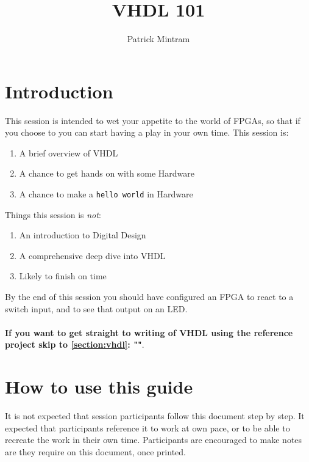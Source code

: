 \documentclass[11pt,a4paper]{article}
\title{VHDL 101}
\author{Patrick Mintram}
\begin{document}
\clearpage\maketitle
\thispagestyle{empty} %
\pagebreak

\section{Introduction}
This session is intended to wet your appetite to the world of FPGAs, so that if you choose to you can start having a play in your own time. This session is:
\begin{enumerate}
    \item A brief overview of VHDL
    \item A chance to get hands on with some Hardware
    \item A chance to make a \texttt{hello world} in Hardware
\end{enumerate}

Things this session is \emph{not}:
\begin{enumerate}
    \item An introduction to Digital Design
    \item A comprehensive deep dive into VHDL
    \item Likely to finish on time
\end{enumerate}

By the end of this session you should have configured an FPGA to react to a switch input, and to see that output on an LED. \\ \\
\textbf{If you want to get straight to writing of VHDL using the reference project skip to \cref{section:vhdl}: ""}. 

\section{How to use this guide}
It is not expected that session participants follow this document step by step. It expected that participants reference it to work at own pace, or to be able to recreate the work in their own time. Participants are encouraged to make notes are they require on this document, once printed. 
\end{document}
